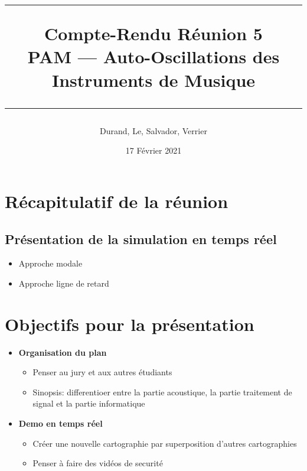 \documentclass[a4paper, 11pt]{article}
\title{
	\noindent\rule{\linewidth}{0.4pt}
	\huge{Compte-Rendu Réunion 5\\}
	\medskip
	\Large{PAM --- Auto-Oscillations des Instruments de Musique}
	\noindent\rule{\linewidth}{1pt}
}
\author{Durand, Le, Salvador, Verrier}
\date{17 Février 2021}
\begin{document}
\maketitle


\section{Récapitulatif de la réunion}
\subsection{Présentation de la simulation en temps réel}
\begin{itemize}
	\item Approche modale
	\item Approche ligne de retard
\end{itemize}


\section{Objectifs pour la présentation}
\begin{itemize}
	\item \textbf{Organisation du plan}
	\begin{itemize}
		\item Penser au jury et aux autres étudiants
		\item Sinopsis: differentioer entre la partie acoustique, la partie traitement de signal et la partie informatique
	\end{itemize}
	\item \textbf{Demo en temps réel}
	\begin{itemize}
		\item Créer une nouvelle cartographie par superposition d'autres cartographies
		\item Penser à faire des vidéos de securité
	\end{itemize}

\end{itemize}
\end{document}
